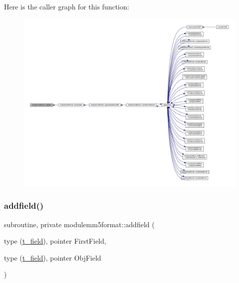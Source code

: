 Here is the caller graph for this function\+:\nopagebreak
\begin{figure}[H]
\begin{center}
\leavevmode
\includegraphics[width=350pt]{namespacemodulemm5format_a6db74d155aaf7a1fd0ac77423986f988_icgraph}
\end{center}
\end{figure}
\mbox{\label{namespacemodulemm5format_a136725afeaeb24f9488c92944b7b982a}} 
\subsubsection{\texorpdfstring{addfield()}{addfield()}}
{\footnotesize\ttfamily subroutine, private modulemm5format\+::addfield (\begin{DoxyParamCaption}\item[{type (\mbox{\hyperlink{structmodulemm5format_1_1t__field}{t\+\_\+field}}), pointer}]{First\+Field,  }\item[{type (\mbox{\hyperlink{structmodulemm5format_1_1t__field}{t\+\_\+field}}), pointer}]{Obj\+Field }\end{DoxyParamCaption})\hspace{0.3cm}{\ttfamily [private]}}

